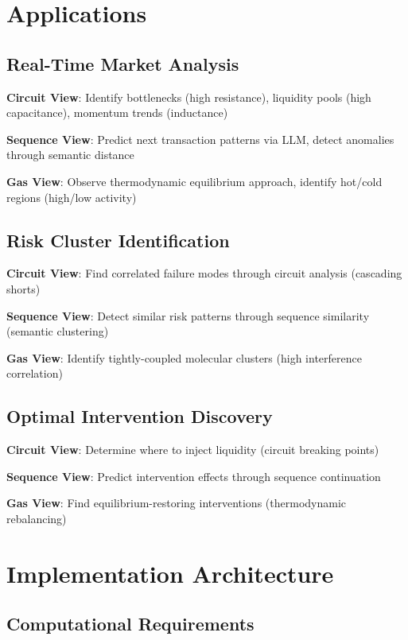 \documentclass[12pt]{article}
\begin{document}
\section{Applications}

\subsection{Real-Time Market Analysis}

\textbf{Circuit View}: Identify bottlenecks (high resistance), liquidity pools (high capacitance), momentum trends (inductance)

\textbf{Sequence View}: Predict next transaction patterns via LLM, detect anomalies through semantic distance

\textbf{Gas View}: Observe thermodynamic equilibrium approach, identify hot/cold regions (high/low activity)

\subsection{Risk Cluster Identification}

\textbf{Circuit View}: Find correlated failure modes through circuit analysis (cascading shorts)

\textbf{Sequence View}: Detect similar risk patterns through sequence similarity (semantic clustering)

\textbf{Gas View}: Identify tightly-coupled molecular clusters (high interference correlation)

\subsection{Optimal Intervention Discovery}

\textbf{Circuit View}: Determine where to inject liquidity (circuit breaking points)

\textbf{Sequence View}: Predict intervention effects through sequence continuation

\textbf{Gas View}: Find equilibrium-restoring interventions (thermodynamic rebalancing)

\section{Implementation Architecture}

\subsection{Computational Requirements}
\end{document}

